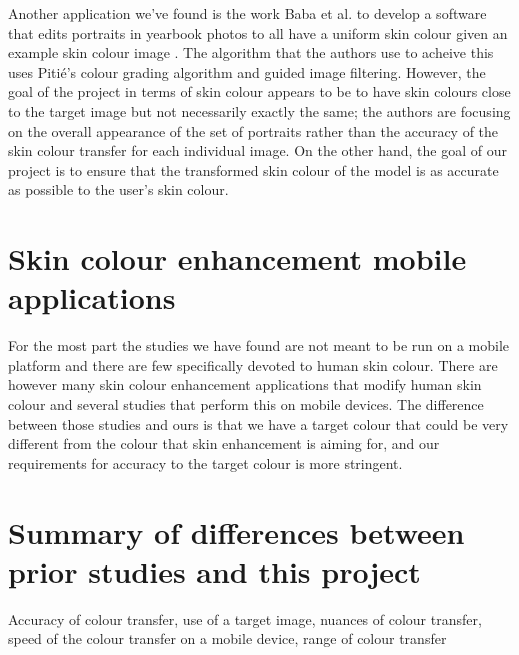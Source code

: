 Another application we've found is the work Baba et al. to develop a software that edits portraits in yearbook photos to all have a uniform skin colour given an example skin colour image \cite{baba_2015_yearbook}. The algorithm that the authors use to acheive this uses Pitié's colour grading algorithm and guided image filtering. However, the goal of the project in terms of skin colour appears to be to have skin colours close to the target image but not necessarily exactly the same; the authors are focusing on the overall appearance of the set of portraits rather than the accuracy of the skin colour transfer for each individual image. On the other hand, the goal of our project is to ensure that the transformed skin colour of the model is as accurate as possible to the user's skin colour.

\section{Skin colour enhancement mobile applications}
For the most part the studies we have found are not meant to be run on a mobile platform and there are few specifically devoted to human skin colour. There are however many skin colour enhancement applications that modify human skin colour and several studies that perform this on mobile devices. 
The difference between those studies and ours is that we have a target colour that could be very different from the colour that skin enhancement is aiming for, and our requirements for accuracy to the target colour is more stringent.

\section{Summary of differences between prior studies and this project}
Accuracy of colour transfer, use of a target image, nuances of colour transfer, speed of the colour transfer on a mobile device, range of colour transfer


